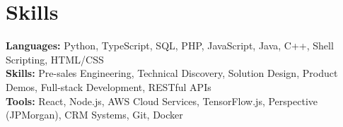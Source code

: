 \documentclass[11pt]{article}       %
\begin{document}

\vspace{-18.5pt}


\section*{Skills}
\textbf{Languages:} Python, TypeScript, SQL, PHP, JavaScript, Java, C++, Shell Scripting, HTML/CSS\\
\textbf{Skills:} Pre-sales Engineering, Technical Discovery, Solution Design, Product Demos, Full-stack Development, RESTful APIs\\
\textbf{Tools:} React, Node.js, AWS Cloud Services, TensorFlow.js, Perspective (JPMorgan), CRM Systems, Git, Docker\\

\vspace{-6.5pt}
\end{document}
